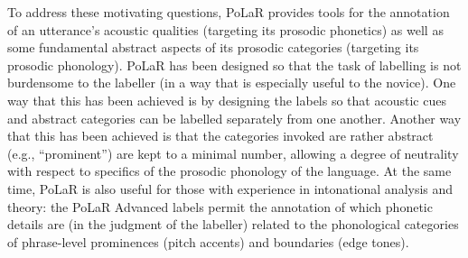 \documentclass[11pt, twoside]{memoir}
\begin{document}


To address these motivating questions, PoLaR provides tools for the annotation of an utterance’s acoustic qualities (targeting its prosodic phonetics) as well as some fundamental abstract aspects of its prosodic categories (targeting its prosodic phonology). PoLaR has been designed so that the task of labelling is not burdensome to the labeller (in a way that is especially useful to the novice). One way that this has been achieved is by designing the labels so that acoustic cues and abstract categories can be labelled separately from one another. Another way that this has been achieved is that the categories invoked are rather abstract (e.g., “prominent”) are kept to a minimal number, allowing a degree of neutrality with respect to specifics of the prosodic phonology of the language. At the same time, PoLaR is also useful for those with experience in intonational analysis and theory: the PoLaR Advanced labels permit the annotation of which phonetic details are (in the judgment of the labeller) related to the phonological categories of phrase-level prominences (pitch accents) and boundaries (edge tones).
\end{document}
